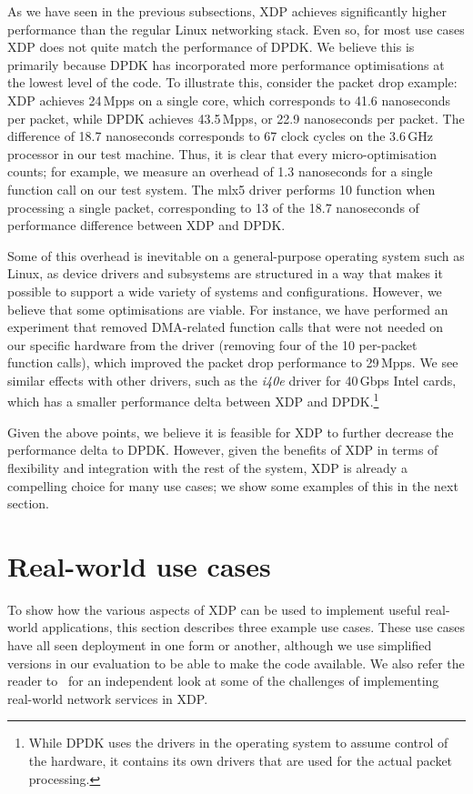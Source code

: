 \documentclass[sigconf]{acmart}
\begin{document}
As we have seen in the previous subsections, XDP achieves significantly higher
performance than the regular Linux networking stack. Even so, for most use cases
XDP does not quite match the performance of DPDK. We believe this is primarily
because DPDK has incorporated more performance optimisations at the lowest level
of the code. To illustrate this, consider the packet drop example: XDP achieves
24\,Mpps on a single core, which corresponds to 41.6 nanoseconds per packet,
while DPDK achieves 43.5\,Mpps, or 22.9 nanoseconds per packet. The difference
of 18.7 nanoseconds corresponds to 67 clock cycles on the 3.6\,GHz processor in
our test machine. Thus, it is clear that every micro-optimisation counts; for
example, we measure an overhead of 1.3 nanoseconds for a single function call on
our test system. The mlx5 driver performs 10 function when processing a single
packet, corresponding to 13 of the 18.7 nanoseconds of performance difference
between XDP and DPDK.

Some of this overhead is inevitable on a general-purpose operating system such
as Linux, as device drivers and subsystems are structured in a way that makes it
possible to support a wide variety of systems and configurations. However, we
believe that some optimisations are viable. For instance, we have performed an
experiment that removed DMA-related function calls that were not needed on our
specific hardware from the driver (removing four of the 10 per-packet function
calls), which improved the packet drop performance to 29\,Mpps.
%
%
We see similar
effects with other drivers, such as the \emph{i40e} driver for 40\,Gbps Intel
cards, which has a smaller performance delta between XDP and
DPDK.\footnote{While DPDK uses the drivers in the operating system to assume
  control of the hardware, it contains its own drivers that are used for the
  actual packet processing.}

Given the above points, we believe it is feasible for XDP to further decrease
the performance delta to DPDK. However, given the benefits of XDP in terms of
flexibility and integration with the rest of the system, XDP is already a
compelling choice for many use cases; we show some examples of this in the next
section.

\section{Real-world use cases}
\label{sec:usecases}
To show how the various aspects of XDP can be used to implement useful
real-world applications, this section describes three example use cases. These
use cases have all seen deployment in one form or another, although we use
simplified versions in our evaluation to be able to make the code available. We
also refer the reader to~\cite{miano2018creating} for an independent look at
some of the challenges of implementing real-world network services in XDP.
\end{document}
